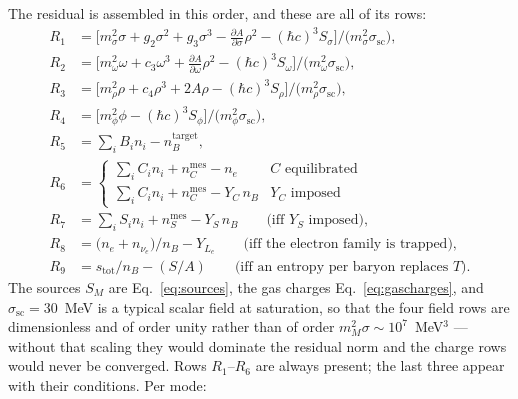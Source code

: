 \documentclass[aps,prc,onecolumn,superscriptaddress,nofootinbib,10pt]{revtex4-2}
\newcommand{\nB}{n_B}
\begin{document}
The residual is assembled in this order, and these are all of its rows:
%
\begin{align}
R_1 &= \Big[ m_\sigma^2 \sigma + g_2 \sigma^2 + g_3 \sigma^3
        - \tfrac{\partial A}{\partial \sigma}\rho^2
        - (\hbar c)^3 S_\sigma \Big] \big/ \big( m_\sigma^2 \sigma_{\mathrm{sc}} \big) ,
\nonumber\\
R_2 &= \Big[ m_\omega^2 \omega + c_3 \omega^3
        + \tfrac{\partial A}{\partial \omega}\rho^2
        - (\hbar c)^3 S_\omega \Big] \big/ \big( m_\omega^2 \sigma_{\mathrm{sc}} \big) ,
\nonumber\\
R_3 &= \Big[ m_\rho^2 \rho + c_4 \rho^3 + 2 A \rho
        - (\hbar c)^3 S_\rho \Big] \big/ \big( m_\rho^2 \sigma_{\mathrm{sc}} \big) ,
\nonumber\\
R_4 &= \Big[ m_\phi^2 \phi - (\hbar c)^3 S_\phi \Big]
        \big/ \big( m_\phi^2 \sigma_{\mathrm{sc}} \big) ,
\label{eq:residual}\\
R_5 &= \sum_i B_i n_i - \nB^{\mathrm{target}} ,
\nonumber\\
R_6 &= \begin{cases}
  \sum_i C_i n_i + n_C^{\mathrm{mes}} - n_e & \text{$C$ equilibrated} \\
  \sum_i C_i n_i + n_C^{\mathrm{mes}} - Y_C\, \nB & \text{$Y_C$ imposed}
\end{cases}
\nonumber\\
R_7 &= \sum_i S_i n_i + n_S^{\mathrm{mes}} - Y_S\, \nB
       \qquad \text{(iff $Y_S$ imposed)},
\nonumber\\
R_8 &= \big( n_e + n_{\nu_e} \big) / \nB - Y_{L_e}
       \qquad \text{(iff the electron family is trapped)},
\nonumber\\
R_9 &= s_{\mathrm{tot}} / \nB - (S/A)
       \qquad \text{(iff an entropy per baryon replaces $T$)}.
\nonumber
\end{align}
%
The sources $S_M$ are Eq.~\eqref{eq:sources}, the gas charges
Eq.~\eqref{eq:gascharges}, and $\sigma_{\mathrm{sc}} = 30$~MeV is a typical scalar field
at saturation, so that the four field rows are dimensionless and of order
unity rather than of order $m_M^2 \sigma \sim 10^7$~MeV$^3$ --- without that
scaling they would dominate the residual norm and the charge rows would never
be converged. Rows $R_1$--$R_6$ are always present; the last three appear with
their conditions. Per mode:
%
\end{document}
